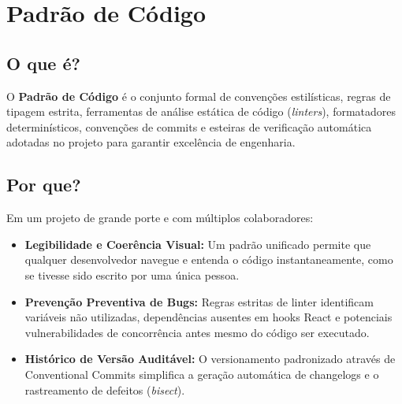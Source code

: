 \documentclass[12pt,a4paper]{article}
\begin{document}
\section{Padrão de Código}

\subsection{O que é?}
O \textbf{Padrão de Código} é o conjunto formal de convenções estilísticas, regras de tipagem estrita, ferramentas de análise estática de código (\textit{linters}), formatadores determinísticos, convenções de commits e esteiras de verificação automática adotadas no projeto para garantir excelência de engenharia.

\subsection{Por que?}
Em um projeto de grande porte e com múltiplos colaboradores:
\begin{itemize}
  \item \textbf{Legibilidade e Coerência Visual:} Um padrão unificado permite que qualquer desenvolvedor navegue e entenda o código instantaneamente, como se tivesse sido escrito por uma única pessoa.
  \item \textbf{Prevenção Preventiva de Bugs:} Regras estritas de linter identificam variáveis não utilizadas, dependências ausentes em hooks React e potenciais vulnerabilidades de concorrência antes mesmo do código ser executado.
  \item \textbf{Histórico de Versão Auditável:} O versionamento padronizado através de Conventional Commits simplifica a geração automática de changelogs e o rastreamento de defeitos (\textit{bisect}).
\end{itemize}
\end{document}
